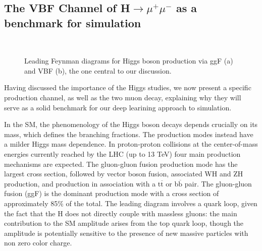 \subsection{The VBF Channel of H$\rightarrow\mu^+\mu^-$ as a benchmark for simulation}

\begin{figure}
    \myfloatalign
     \quad
     \\
    \caption[ggF and VBF]{Leading Feynman diagrams for Higgs boson production via ggF (a) and VBF (b), the one central to our discussion.}\label{fig:feypro}
\end{figure}
Having discussed the importance of the Higgs studies, we now present a specific production channel, as well as the two muon decay, explaining why they will serve as a solid benchmark for our deep learining approach to simulation.

In the SM, the phenomenology of the Higgs boson decays depends crucially on its mass,
which defines the branching fractions. The production modes instead have a milder Higgs
mass dependence. In proton-proton collisions at the center-of-mass energies currently reached by the LHC
(up to 13 TeV) four main production mechanisms are expected. The gluon-gluon fusion
production mode has the largest cross section, followed by vector boson fusion, associated
WH and ZH production, and production in association with a t$\overline{\text{t}}$  or b$\overline{\text{b}}$ pair. The gluon-gluon fusion (ggF) is the dominant production mode with a cross section of
approximately 85$\%$ of the total. The leading diagram involves a quark loop, given the fact that the H does not directly couple with massless gluons: the main
contribution to the SM amplitude arises from the top quark loop, though the amplitude is
potentially sensitive to the presence of new massive particles with non zero color charge.

